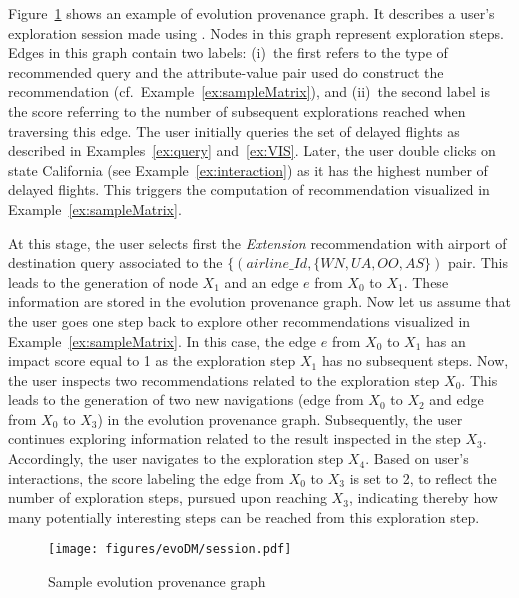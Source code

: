 		
\begin{example}
\label{ex:expo-session}
Figure~\ref{fig:session} shows an example of evolution provenance graph. It describes a user's exploration session made using \prototype{}.%
Nodes in this graph represent exploration steps. Edges in this graph contain two labels: (i)~the first refers to the type of recommended query and the attribute-value pair used do construct the recommendation (cf.~Example~\ref{ex:sampleMatrix}), and (ii)~the second label is the score referring to the number of subsequent explorations reached when traversing this edge.
The user initially queries the set of delayed flights as described in Examples~\ref{ex:query} and~\ref{ex:VIS}. Later, the user double clicks on state California (see Example~\ref{ex:interaction}) as it has the highest number of delayed flights. This triggers the computation of recommendation visualized in Example~\ref{ex:sampleMatrix}. 

At this stage, the user selects first the \emph{Extension} recommendation with airport of destination query associated to the  $\{(airline\_Id, \{WN,UA,OO,AS\})$ pair. This leads to the generation of node $X_1$ and an edge $e$ from $X_0$ to $X_1$. These information are stored in the evolution provenance graph.   
Now let us assume that the user goes one step back to explore other recommendations visualized in Example~\ref{ex:sampleMatrix}.  In this case, the edge $e$ from $X_0$ to $X_1$ has an impact score equal to 1 as the exploration step $X_1$ has no subsequent steps. 
Now, the user inspects two recommendations related to the exploration step $X_0$. This leads to the generation of two new navigations (edge from $X_0$ to $X_2$ and edge from $X_0$ to $X_3$) in the evolution provenance graph. 
Subsequently, the user continues exploring information related to the result inspected in the step $X_3$. Accordingly, the user navigates to the exploration step $X_4$. 
Based on user's interactions, the score labeling the edge from $X_0$ to $X_3$  is set to 2, to reflect the number of exploration steps, pursued upon reaching $X_3$, indicating thereby how many potentially interesting steps can be reached from this exploration step.
\end{example}

\begin{figure}[t]
\centering
\texttt{[image: figures/evoDM/session.pdf]}
\caption{Sample evolution provenance graph}
\label{fig:session}
\end{figure}


